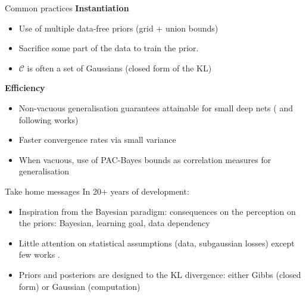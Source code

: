 \documentclass{presentation}
\begin{document}
\begin{xframe}{Common practices}
    \vspace{0.5cm}
    {\bf Instantiation}
    \begin{itemize}
        \item Use of multiple data-free priors (grid + union bounds) 
        \item Sacrifice some part of the data to train the prior.
        \item $\mathcal{C}$ is often a set of Gaussians (closed form of the KL)
    \end{itemize}
    \vspace{1cm}
    {\bf Efficiency}
        \begin{itemize}
            \item Non-vacuous generalisation guarantees attainable for small deep nets (\citealp{dziugaite2017computing} and following works)
            \item Faster convergence rates via small variance \citep{tolstikhin2013pac}
            \item When vacuous, use of PAC-Bayes bounds as correlation measures for generalisation \citep{neyshabur2017explor}
        \end{itemize}
\end{xframe}

\begin{xframe}{Take home messages}
    \vspace{0.5cm}
    In 20+ years of development:
    \begin{itemize}
      \item Inspiration from the Bayesian paradigm: consequences on the perception on the priors: Bayesian, learning goal, data dependency
      \item Little attention on statistical assumptions (\iid data, subgaussian losses) except few works \eg \citep{seldin2012pac,kuzborskij2019efron}.
      \item Priors and posteriors are designed \wrt to the KL divergence: either Gibbs (closed form) or Gaussian (computation)
    \end{itemize}
    \vspace{0.5 cm}
    {}
  \end{xframe}

\end{document}
